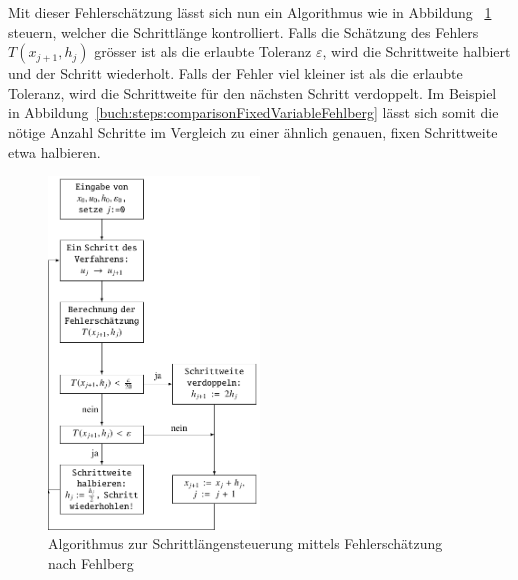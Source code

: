 Mit dieser Fehlerschätzung lässt sich nun ein Algorithmus wie in Abbildung ~\ref{buch:steps:flowchartfehlberg} steuern,
welcher die Schrittlänge kontrolliert. Falls die Schätzung des Fehlers $T(x_{j+1}, h_j)$ grösser ist als die erlaubte Toleranz $\varepsilon$,
wird die Schrittweite halbiert und der Schritt wiederholt.
Falls der Fehler viel kleiner ist als die erlaubte Toleranz, wird die Schrittweite für den nächsten Schritt verdoppelt.
Im Beispiel in Abbildung~\ref{buch:steps:comparisonFixedVariableFehlberg} lässt sich somit die nötige Anzahl Schritte
im Vergleich zu einer ähnlich genauen, fixen Schrittweite etwa halbieren.

\begin{figure}
  \centering
  \includegraphics[width=0.5\textwidth]{papers/steps/img/Fehlberg_Flowchart.pdf}
  \caption{Algorithmus zur Schrittlängensteuerung mittels Fehlerschätzung nach Fehlberg
  \cite{steps:Numerische-Mathematik}
    \label{buch:steps:flowchartfehlberg}}
\end{figure}

